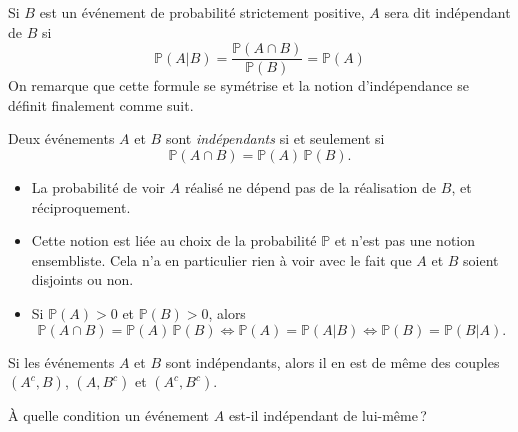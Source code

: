 Si \(B\) est un événement de probabilité strictement positive, \(A\)
sera dit indépendant de \(B\) si
\[\mathbb{P}(A | B) = \frac{\mathbb{P}(A\cap B)}{\mathbb{P}(B)} = \mathbb{P}(A)\]
On remarque que cette formule se symétrise et la notion d'indépendance
se définit finalement comme suit.

\begin{definition}\label{I-induxe9pendance-de-deux-uxe9vuxe9nements}

Deux événements \(A\) et \(B\) sont \emph{indépendants} si et seulement
si \begin{equation*}
\mathbb{P}(A\cap B) = \mathbb{P}(A)\, \mathbb{P}(B).
\end{equation*}
\end{definition}

\begin{remarque}\label{I-remarques}
\begin{itemize}
\tightlist
\item
  La probabilité de voir \(A\) réalisé ne dépend pas de la réalisation
  de \(B\), et réciproquement.
\item
  Cette notion est liée au choix de la probabilité \(\mathbb{P}\) et
  n'est pas une notion ensembliste. Cela n'a en particulier rien à voir
  avec le fait que \(A\) et \(B\) soient disjoints ou non.
\item
  Si \(\mathbb{P}(A)>0\) et \(\mathbb{P}(B)>0\), alors \begin{equation*}
   \mathbb{P}(A\cap B) = \mathbb{P}(A)\, \mathbb{P}(B) \Leftrightarrow \mathbb{P}(A) = \mathbb{P}(A|B) \Leftrightarrow \mathbb{P}(B) = \mathbb{P}(B|A).
   \end{equation*}
\end{itemize}
\end{remarque}

\begin{proposition}\label{I-proposition}
Si les événements \(A\) et \(B\) sont indépendants, alors il en est de
même des couples \((A^c,B)\), \((A,B^c)\) et \((A^c,B^c)\).
\end{proposition}

\label{I-indep}

\label{I-autoindep}
À quelle condition un événement \(A\) est-il indépendant de
lui-même\,?

